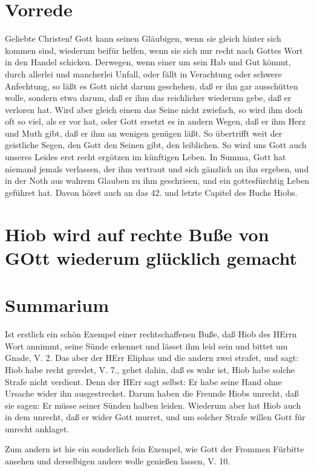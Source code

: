 \section{Vorrede}

Geliebte Christen! Gott kann seinen Gläubigen, wenn sie gleich hinter sich kommen sind, wiederum beifür helfen, wenn sie sich nur recht nach Gottes Wort in den Handel schicken. Derwegen, wenn einer um sein Hab und Gut kömmt, durch allerlei und mancherlei Unfall, oder fällt in Verachtung oder schwere Anfechtung, so läßt es Gott nicht darum geschehen, daß er ihn gar ausschütten wolle, sondern etwa darum, daß er ihm das reichlicher wiederum gebe, daß er verloren hat. Wird aber gleich einem das Seine nicht zwiefach, so wird ihm doch oft so viel, als er vor hat, oder Gott ersetzt es in andern Wegen, daß er ihm Herz und Muth gibt, daß er ihm an wenigen genügen läßt. So übertrifft weit der geistliche Segen, den Gott den Seinen gibt, den leiblichen. So wird uns Gott auch unseres Leides erst recht ergötzen im künftigen Leben. In Summa, Gott hat niemand jemals verlassen, der ihm vertraut und sich gänzlich an ihn ergeben, und in der Noth aus wahrem Glauben zu ihm geschrieen, und ein gottesfürchtig Leben geführet hat. Davon höret auch an das 42. und letzte Capitel des Buchs Hiobs.

\section[Hiob wird auf rechte Buße von GOtt wiederum]{Hiob wird auf rechte Buße von GOtt wiederum glücklich gemacht}

\section{Summarium}

Ist erstlich ein schön Exempel einer rechtschaffenen Buße, daß Hiob des HErrn Wort annimmt, seine Sünde erkennet und lässet ihm leid sein und bittet um Gnade, V. 2. Das aber der HErr Eliphas und die andern zwei strafet, und sagt: Hiob habe recht geredet, V. 7., gehet dahin, daß es wahr ist, Hiob habe solche Strafe nicht verdient. Denn der HErr sagt selbst: Er habe seine Hand ohne Ursache wider ihn ausgestrecket. Darum haben die Freunde Hiobs unrecht, daß sie sagen: Er müsse seiner Sünden halben leiden. Wiederum aber hat Hiob auch in dem unrecht, daß er wider Gott murret, und um solcher Strafe willen Gott für unrecht anklaget.

Zum andern ist hie ein sonderlich fein Exempel, wie Gott der Frommen Fürbitte ansehen und derselbigen andere wolle genießen lassen, V. 10.

